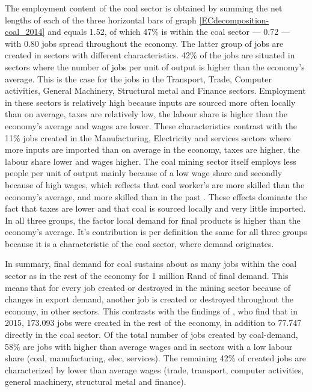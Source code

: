 \documentclass[12pt,english]{article}
\begin{document}
The employment content of the coal sector is obtained by summing the net lengths of each of the three horizontal bars of graph \ref{ECdecomposition-coal_2014} and equals 1.52, of which 47\% is within the coal sector --- 0.72 --- with 0.80 jobs spread throughout the economy. %
The latter group of jobs are created in sectors with different characteristics. 42\% of the jobs are situated in sectors where the number of jobs per unit of output is higher than the economy's average. This is the case for the jobs in the Transport, Trade, Computer activities, General Machinery, Structural metal and Finance sectors. Employment in these sectors is relatively high because inputs are sourced more often locally than on average, taxes are relatively low, the labour share is higher than the economy's average and wages are lower. These characteristics contrast with the 11\% jobs created in the Manufacturing, Electricity and services sectors where more inputs are imported than on average in the economy, taxes are higher, the labour share lower and wages higher. The coal mining sector itself employs less people per unit of output mainly because of a low wage share and secondly because of high wages, which reflects that coal worker's are more skilled than the economy's average, and more skilled than in the past \citep{burton2018coal}. These effects dominate the fact that taxes are lower and that coal is sourced locally and very little imported. In all three groups, the factor local demand for final products is higher than the economy's average. It's contribution is per definition the same for all three groups because it is a characteristic of the coal sector, where demand originates. %

In summary, final demand for coal sustains about as many jobs within the coal sector as in the rest of the economy for 1 million Rand of final demand. This means that for every job created or destroyed in the mining sector because of changes in export demand, another job is created or destroyed throughout the economy, in other sectors. This contrasts with the findings of , who find that in 2015, 173.093 jobs were created in the rest of the economy, in addition to 77.747 directly in the coal sector. Of the total number of jobs created by coal-demand, 58\% are jobs with higher than average wages and in sectors with a low labour share (coal, manufacturing, elec, services). The remaining 42\% of created jobs are characterized by lower than average wages (trade, transport, computer activities, general machinery, structural metal and finance). %
\end{document}
